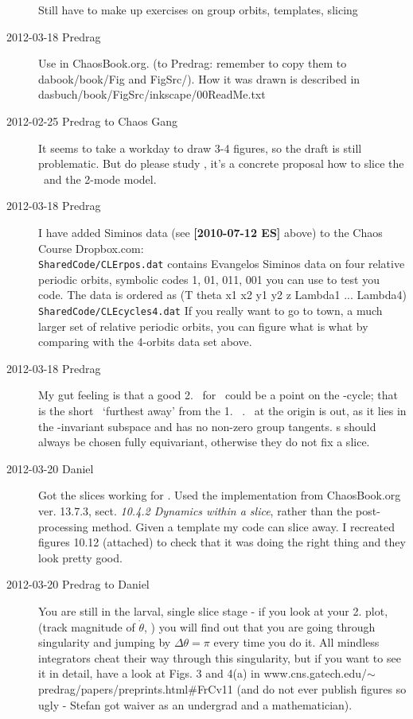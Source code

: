 \begin{description}
Still have to make up exercises on group orbits, templates, slicing


\item[2012-03-18 Predrag]               \toCB
Use  in ChaosBook.org. (to Predrag: remember to
copy them to dabook/book/Fig and FigSrc/). How it was drawn is described
in dasbuch/book/FigSrc/inkscape/00ReadMe.txt


\item[2012-02-25 Predrag to Chaos Gang]
It seems to take a workday to draw 3-4 figures, so the draft is still
problematic. But do please study , it's a
concrete proposal how to slice the \cLf\ and the 2-mode model.

\item[2012-03-18 Predrag] I have added Siminos data (see {\bf [2010-07-12
ES]} above) to the Chaos Course Dropbox.com:
\\
          \texttt{SharedCode/CLErpos.dat}
            contains Evangelos Siminos data on four relative periodic
            orbits, symbolic codes 1, 01, 011, 001 you can use to test
            you code. The data is ordered as
            (T theta x1 x2 y1 y2 z Lambda1 ... Lambda4)
\\
          \texttt{SharedCode/CLEcycles4.dat}
            If you really want to go to town, a much larger set of
            relative periodic orbits, you can figure what is what by
            comparing with the 4-orbits data set above.

\item[2012-03-18 Predrag] My gut feeling is that a good 2. \template\ for
\cLf\ could be a point on the -cycle; that is the short \rpo\
`furthest away' from the 1. \template\ . \Eqv\ at the origin is
out, as it lies in the \Group-invariant subspace and has no non-zero
group tangents. \Template s should always be chosen fully equivariant,
otherwise they do not fix a slice.

\item[2012-03-20 Daniel]
Got the slices working for \cLf. Used the implementation from
ChaosBook.org ver. 13.7.3, sect. \emph{10.4.2 Dynamics within a slice},
rather than the post-processing method. Given a template my code can
slice away. I recreated figures 10.12 (attached) to check that it was
doing the right thing and they look pretty good.


\item[2012-03-20 Predrag  to Daniel]
You are still in the larval, single slice stage - if you look at your 2.
plot, (track magnitude of $\dot{\theta}$, \etc) you will find out that
you are going through singularity and jumping by $\Delta \theta = \pi$
every time you do it. All mindless integrators cheat their way through
this singularity, but if you want to see it in detail, have a look at
Figs. 3 and 4(a) in
{www.cns.gatech.edu/$\sim$predrag/papers/preprints.html\#FrCv11} (and do
not ever publish figures so ugly - Stefan\rf{FrCv11} got waiver as an
undergrad and a mathematician).


\end{description}
